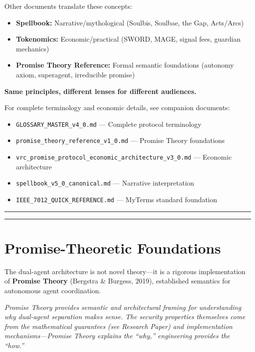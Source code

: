 \documentclass[
]{article}
\begin{document}
Other documents translate these concepts:

\begin{itemize}
\item
  \textbf{Spellbook:} Narrative/mythological (Soulbis, Soulbae, the Gap,
  Acts/Arcs)
\item
  \textbf{Tokenomics:} Economic/practical (SWORD, MAGE, signal fees,
  guardian mechanics)
\item
  \textbf{Promise Theory Reference:} Formal semantic foundations
  (autonomy axiom, superagent, irreducible promise)
\end{itemize}

\textbf{Same principles, different lenses for different audiences.}

For complete terminology and economic details, see companion documents:

\begin{itemize}
\item
  \texttt{GLOSSARY\_MASTER\_v4\_0.md} --- Complete protocol terminology
\item
  \texttt{promise\_theory\_reference\_v1\_0.md} --- Promise Theory
  foundations
\item
  \texttt{vrc\_promise\_protocol\_economic\_architecture\_v3\_0.md} ---
  Economic architecture
\item
  \texttt{spellbook\_v5\_0\_canonical.md} --- Narrative interpretation
\item
  \texttt{IEEE\_7012\_QUICK\_REFERENCE.md} --- MyTerms standard
  foundation
\end{itemize}

\begin{center}\rule{0.5\linewidth}{0.5pt}\end{center}

\begin{center}\rule{0.5\linewidth}{0.5pt}\end{center}

\section{Promise-Theoretic
Foundations}\label{promise-theoretic-foundations}

The dual-agent architecture is not novel theory---it is a rigorous
implementation of \textbf{Promise Theory} (Bergstra \& Burgess, 2019),
established semantics for autonomous agent coordination.

\emph{Promise Theory provides semantic and architectural framing for
understanding why dual-agent separation makes sense. The security
properties themselves come from the mathematical guarantees (see
Research Paper) and implementation mechanisms---Promise Theory explains
the ``why,'' engineering provides the ``how.''}
\end{document}
